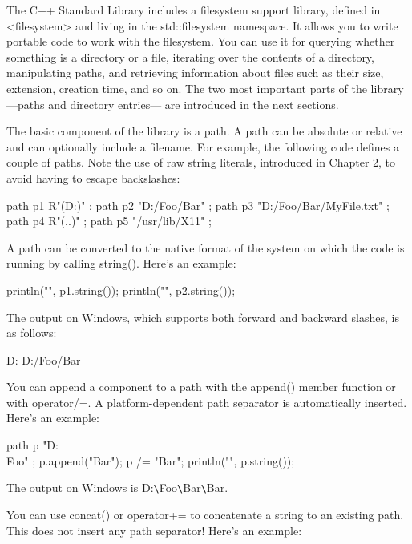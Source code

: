 
The C++ Standard Library includes a filesystem support library, defined in <filesystem> and living in the std::filesystem namespace. It allows you to write portable code to work with the filesystem. You can use it for querying whether something is a directory or a file, iterating over the contents of a directory, manipulating paths, and retrieving information about files such as their size, extension, creation time, and so on. The two most important parts of the library—paths and directory entries— are introduced in the next sections.


The basic component of the library is a path. A path can be absolute or relative and can optionally include a filename. For example, the following code defines a couple of paths. Note the use of raw string literals, introduced in Chapter 2, to avoid having to escape backslashes:

\begin{cpp}
path p1 { R"(D:\Foo\Bar)" };
path p2 { "D:/Foo/Bar" };
path p3 { "D:/Foo/Bar/MyFile.txt" };
path p4 { R"(..\SomeFolder)" };
path p5 { "/usr/lib/X11" };
\end{cpp}

A path can be converted to the native format of the system on which the code is running by calling string(). Here’s an example:

\begin{cpp}
println("{}", p1.string());
println("{}", p2.string());
\end{cpp}

The output on Windows, which supports both forward and backward slashes, is as follows:

\begin{shell}
D:\Foo\Bar
D:/Foo/Bar
\end{shell}

You can append a component to a path with the append() member function or with operator/=. A platform-dependent path separator is automatically inserted. Here’s an example:

\begin{cpp}
path p { "D:\\Foo" };
p.append("Bar");
p /= "Bar";
println("{}", p.string());
\end{cpp}

The output on Windows is D:\verb|\|Foo\verb|\|Bar\verb|\|Bar.

You can use concat() or operator+= to concatenate a string to an existing path. This does not insert any path separator! Here’s an example:

